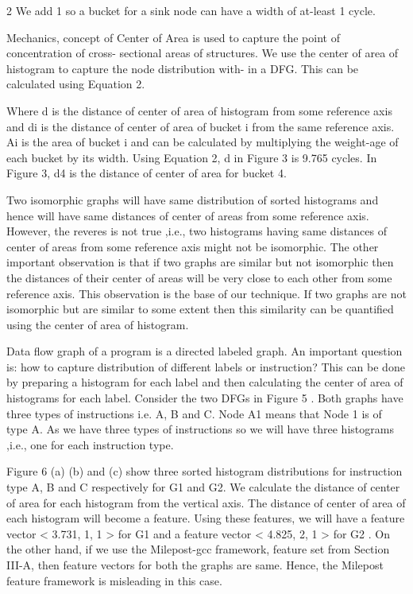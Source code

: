 \documentclass[conference]{IEEEtran}
\begin{document}
2 We add 1 so a bucket for a sink node can have a width of at-least 1 cycle.

Mechanics, concept of Center of Area is used to capture the point of concentration of cross- sectional areas of structures. We use the center of area of histogram to capture the node distribution with- in a DFG. This can be calculated using Equation 2.\pra

Where d is the distance of center of area of histogram from some reference axis and di is the distance of center of area of bucket i from the same reference axis. Ai is the area of bucket i and can be calculated by multiplying the weight-age of each bucket by its width. Using Equation 2, d in Figure 3 is 9.765 cycles. In Figure 3, d4 is the distance of center of area for bucket 4.

Two isomorphic graphs will have same distribution of sorted histograms and hence will have same distances of center of areas from some reference axis. However, the reveres is not true ,i.e., two histograms having same distances of center of areas from some reference axis might not be isomorphic. The other important observation is that if two graphs are similar but not isomorphic then the distances of their center of areas will be very close to each other from some reference axis. This observation is the base of our technique. If two graphs are not isomorphic but are similar to some extent then this similarity can be quantified using the center of area of histogram. 


Data flow graph of a program is a directed labeled graph. An important question is: how to capture distribution of different labels or instruction? This can be done by preparing a histogram for each label and then calculating the center of area of histograms for each label. Consider the two DFGs in Figure 5 . Both graphs have three types of instructions i.e. A, B and C. Node A1 means that Node 1 is of type A. As we have three types of instructions so we will have three histograms ,i.e., one for each instruction type.

Figure 6 (a) (b) and (c) show three sorted histogram distributions for instruction type A, B and C respectively for G1 and G2. We calculate the distance of center of area for each histogram from the vertical axis. The distance of center of area of each histogram will become a feature. Using these features, we will have a feature vector < 3.731, 1, 1 > for G1 and a feature vector < 4.825, 2, 1 > for G2 . On the other hand, if we use the Milepost-gcc framework, feature set from Section III-A, then feature vectors for both the graphs are same. Hence, the Milepost feature framework is misleading in this case.
\end{document}

